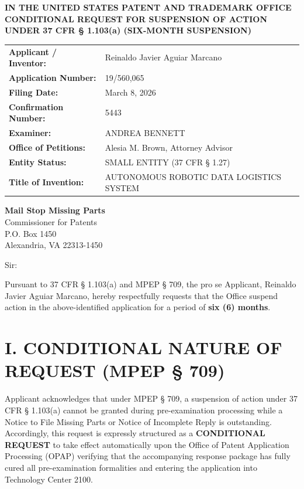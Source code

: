 \documentclass[11pt,letterpaper]{article}
\begin{document}
\thispagestyle{empty}

\begin{center}
    \textbf{\large IN THE UNITED STATES PATENT AND TRADEMARK OFFICE} \\
    \vspace{0.3cm}
    \textbf{\large CONDITIONAL REQUEST FOR SUSPENSION OF ACTION} \\
    \textbf{\normalsize UNDER 37 CFR \S{} 1.103(a) (SIX-MONTH SUSPENSION)}
\end{center}

\vspace{0.4cm}
\noindent\begin{tabular}{p{2.3in}p{4.0in}}
\textbf{Applicant / Inventor:} & Reinaldo Javier Aguiar Marcano \\
\textbf{Application Number:} & 19/560,065 \\
\textbf{Filing Date:} & March 8, 2026 \\
\textbf{Confirmation Number:} & 5443 \\
\textbf{Examiner:} & ANDREA BENNETT \\
\textbf{Office of Petitions:} & Alesia M. Brown, Attorney Advisor \\
\textbf{Entity Status:} & SMALL ENTITY (37 CFR \S{} 1.27) \\
\textbf{Title of Invention:} & AUTONOMOUS ROBOTIC DATA LOGISTICS SYSTEM \\
\end{tabular}

\vspace{0.5cm}
\noindent\textbf{Mail Stop Missing Parts} \\
Commissioner for Patents \\
P.O. Box 1450 \\
Alexandria, VA 22313-1450

\vspace{0.2cm}
Sir:

Pursuant to 37 CFR \S{} 1.103(a) and MPEP \S{} 709, the pro se Applicant, Reinaldo Javier Aguiar Marcano, hereby respectfully requests that the Office suspend action in the above-identified application for a period of \textbf{six (6) months}.

\section*{I. CONDITIONAL NATURE OF REQUEST (MPEP \S{} 709)}

Applicant acknowledges that under MPEP \S{} 709, a suspension of action under 37 CFR \S{} 1.103(a) cannot be granted during pre-examination processing while a Notice to File Missing Parts or Notice of Incomplete Reply is outstanding. Accordingly, this request is expressly structured as a \textbf{CONDITIONAL REQUEST} to take effect automatically upon the Office of Patent Application Processing (OPAP) verifying that the accompanying response package has fully cured all pre-examination formalities and entering the application into Technology Center 2100.
\end{document}
